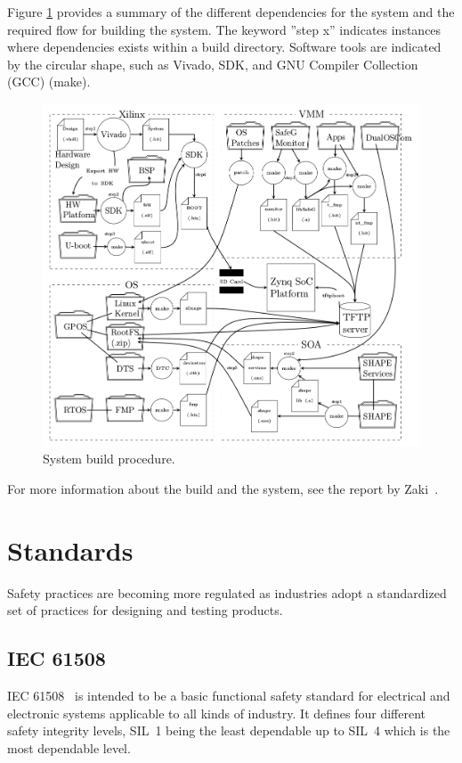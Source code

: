 Figure \ref{fig:system_build} provides a summary of the different dependencies for the system and the required flow for building the system. The keyword ”step x” indicates instances where dependencies exists within a build directory. Software tools are indicated by the circular shape, such as Vivado, SDK, and GNU Compiler Collection (GCC) (make).

\begin{figure}[H]
\centering
\includegraphics[width=\textwidth]{./img/literature_build.png}
\caption{System build procedure.\cite{zaki2016}}\label{fig:system_build}
\end{figure}

For more information about the build and the system, see the report by Zaki~\cite{zaki2016}.

\section{Standards}
Safety practices are becoming more regulated as industries adopt a standardized set of practices for designing and testing products. %

\subsection{IEC 61508}
IEC 61508~\cite{IEC61508} is intended to be a basic functional safety standard for electrical and electronic systems applicable to all kinds of industry. It defines four different safety integrity levels, SIL~1 being the least dependable up to SIL~4 which is the most dependable level.


